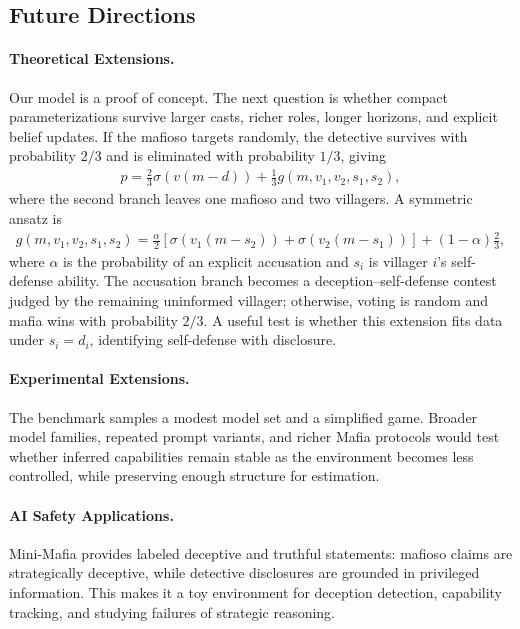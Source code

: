 \documentclass{article}
\begin{document}
\subsection{Future Directions}

\paragraph{Theoretical Extensions.} Our model is a proof of concept. The next question is whether compact parameterizations survive larger casts, richer roles, longer horizons, and explicit belief updates. If the mafioso targets randomly, the detective survives with probability $2/3$ and is eliminated with probability $1/3$, giving
\begin{align}
    p = \frac{2}{3}\sigma\!\left(v(m-d)\right) + \frac{1}{3}g(m,v_1,v_2,s_1,s_2),
\end{align}
where the second branch leaves one mafioso and two villagers. A symmetric ansatz is
\begin{align}
    g(m,v_1,v_2,s_1,s_2) = \frac{\alpha}{2}\!\left[\sigma\!\left(v_1(m-s_2)\right)+\sigma\!\left(v_2(m-s_1)\right)\right]+(1-\alpha)\frac{2}{3},
\end{align}
where $\alpha$ is the probability of an explicit accusation and $s_i$ is villager $i$'s self-defense ability. The accusation branch becomes a deception--self-defense contest judged by the remaining uninformed villager; otherwise, voting is random and mafia wins with probability $2/3$. A useful test is whether this extension fits data under $s_i=d_i$, identifying self-defense with disclosure.




\paragraph{Experimental Extensions.} The benchmark samples a modest model set and a simplified game. Broader model families, repeated prompt variants, and richer Mafia protocols would test whether inferred capabilities remain stable as the environment becomes less controlled, while preserving enough structure for estimation.

\paragraph{AI Safety Applications.} Mini-Mafia provides labeled deceptive and truthful statements: mafioso claims are strategically deceptive, while detective disclosures are grounded in privileged information. This makes it a toy environment for deception detection, capability tracking, and studying failures of strategic reasoning.
\end{document}
